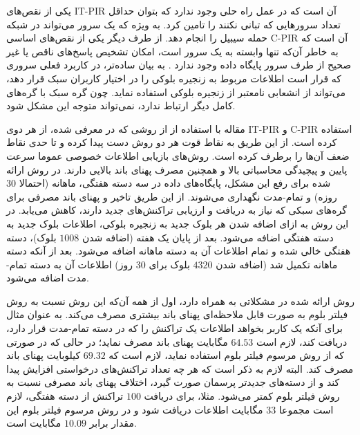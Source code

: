یکی از نقص‌های IT-PIR آن است که در عمل راه حلی وجود ندارد که بتوان حداقل تعداد سرورهایی که تبانی نکنند را تامین کرد. به ویژه که یک سرور می‌تواند در شبکه حمله سیبیل
را انجام دهد. از طرف دیگر یکی از نقص‌های اساسی C-PIR آن است که به خاطر آن‌که تنها وابسته به یک سرور است، امکان تشخیص پاسخ‌های ناقص یا غیر صحیح از طرف سرور پایگاه داده وجود ندارد \cite{Qin2019}. به بیان ساده‌تر، در کاربرد فعلی سروری که قرار است اطلاعات مربوط به زنجیره بلوکی را در اختیار کاربران سبک قرار دهد،‌ می‌تواند از انشعابی نامعتبر از زنجیره بلوکی استفاده نماید. چون گره سبک با گره‌های کامل دیگر ارتباط ندارد، نمی‌تواند متوجه این مشکل شود.

مقاله \cite{Qin2019} با استفاده از از روشی که در \cite{Devet2014} معرفی شده، از هر دوی  IT-PIR و  C-PIR استفاده کرده است. از این طریق به نقاط قوت هر دو روش دست پیدا کرده و تا حدی نقاط ضعف آن‌ها را برطرف کرده است. روش‌های بازیابی اطلاعات خصوصی عموما سرعت پایین و پیچیدگی محاسباتی بالا و همچنین مصرف پهنای باند بالایی دارند. در روش ارائه شده  \cite{Qin2019} برای رفع این مشکل، پایگاه‌های داده‌ در سه دسته هفتگی، ماهانه (احتمالا
$30$
روزه) و تمام-مدت نگهداری می‌شوند. از این طریق تاخیر و پهنای باند مصرفی برای گره‌های سبکی که نیاز به دریافت و ارزیابی تراکنش‌های جدید دارند، کاهش می‌یابد. در این روش به ازای اضافه شدن هر بلوک جدید به زنجیره بلوکی، اطلاعات بلوک جدید به دسته هفتگی اضافه می‌شود. بعد از پایان یک هفته (اضافه شدن $1008$ بلوک)، دسته هفتگی خالی شده و تمام اطلاعات آن به دسته ماهانه اضافه می‌شود. بعد از آنکه دسته ماهانه تکمیل شد (اضافه شدن $4320$ بلوک برای $30$ روز) اطلاعات آن به دسته تمام-مدت اضافه می‌شود. 


روش ارائه شده در \cite{Qin2019} مشکلاتی به همراه دارد، اول از همه آن‌که این روش نسبت به روش فیلتر بلوم \cite{Hearn2013} به صورت قابل ملاحظه‌ای پهنای باند بیشتری مصرف می‌کند. به عنوان مثال برای آنکه یک کاربر بخواهد اطلاعات یک تراکنش را که در دسته تمام-مدت قرار دارد، دریافت کند، لازم است $64.53$ مگابایت پهنای باند مصرف نماید؛ در حالی که در صورتی که از روش مرسوم فیلتر بلوم استفاده نماید، لازم است که $69.32$ کیلوبایت پهنای باند مصرف کند. البته لازم به ذکر است که هر چه تعداد تراکنش‌های درخواستی افزایش پیدا کند و از دسته‌های جدیدتر پرسمان صورت گیرد، اختلاف پهنای باند مصرفی نسبت به روش فیلتر بلوم کمتر می‌شود. مثلا، برای دریافت $100$ تراکنش از دسته هفتگی، لازم است مجموعا $33$ مگابایت اطلاعات دریافت شود و در روش مرسوم فیلتر بلوم این مقدار برابر $10.09$ مگابایت است.


